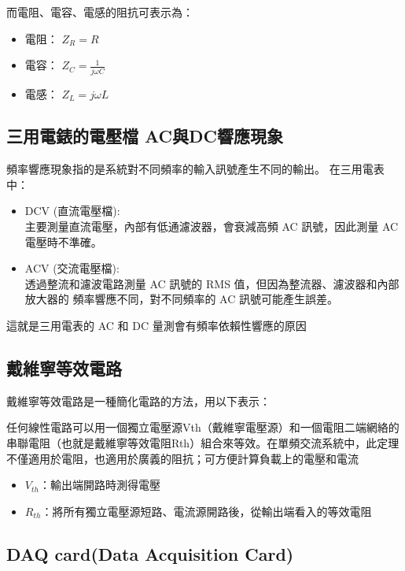 \documentclass[12pt,a4paper]{article}
\begin{document}
\begin{CJK}{UTF8}{bkai}
而電阻、電容、電感的阻抗可表示為：

\begin{itemize}
    \item 電阻： $Z_{R} = R$
    \item 電容： $Z_{C} = \frac{1}{j\omega C}$
    \item 電感： $Z_{L} = j\omega L$
\end{itemize}

\subsection{三用電錶的電壓檔 AC與DC響應現象}
\hfill

頻率響應現象指的是系統對不同頻率的輸入訊號產生不同的輸出。
在三用電表中：
\begin{itemize}
    \item DCV (直流電壓檔):\\
    主要測量直流電壓，內部有低通濾波器，會衰減高頻 AC 訊號，因此測量 AC 電壓時不準確。
    \item ACV (交流電壓檔):\\
    透過整流和濾波電路測量 AC 訊號的 RMS 值，但因為整流器、濾波器和內部放大器的 頻率響應不同，對不同頻率的 AC 訊號可能產生誤差。
\end{itemize}

這就是三用電表的 AC 和 DC 量測會有頻率依賴性響應的原因

\subsection{戴維寧等效電路}
\hfill

戴維寧等效電路是一種簡化電路的方法，用以下表示：

任何線性電路可以用一個獨立電壓源Vth（戴維寧電壓源）和一個電阻二端網絡的串聯電阻（也就是戴維寧等效電阻Rth）組合來等效。在單頻交流系統中，此定理不僅適用於電阻，也適用於廣義的阻抗；可方便計算負載上的電壓和電流
\begin{itemize}
    \item $V_{th}$：輸出端開路時測得電壓
    \item $R_{th}$：將所有獨立電壓源短路、電流源開路後，從輸出端看入的等效電阻
\end{itemize}

\subsection{DAQ card(Data Acquisition Card)}
\hfill


\end{CJK}
\end{document}
